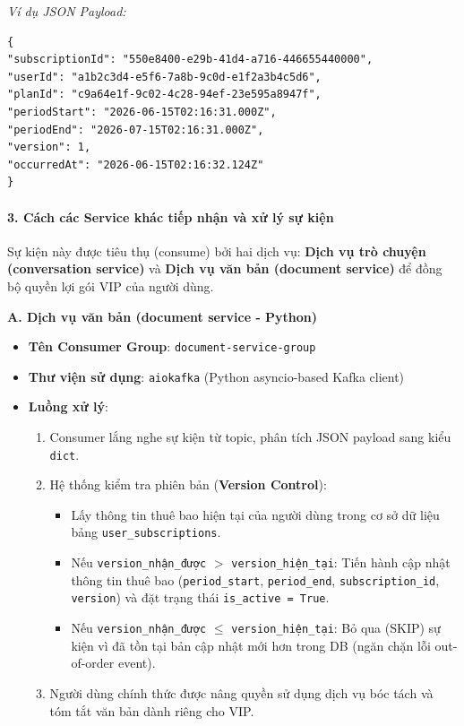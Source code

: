 \textit{Ví dụ JSON Payload:}
\begin{verbatim}
{
"subscriptionId": "550e8400-e29b-41d4-a716-446655440000",
"userId": "a1b2c3d4-e5f6-7a8b-9c0d-e1f2a3b4c5d6",
"planId": "c9a64e1f-9c02-4c28-94ef-23e595a8947f",
"periodStart": "2026-06-15T02:16:31.000Z",
"periodEnd": "2026-07-15T02:16:31.000Z",
"version": 1,
"occurredAt": "2026-06-15T02:16:32.124Z"
}
\end{verbatim}

\paragraph{3. Cách các Service khác tiếp nhận và xử lý sự kiện}
Sự kiện này được tiêu thụ (consume) bởi hai dịch vụ: \textbf{Dịch vụ trò chuyện (conversation service)} và \textbf{Dịch vụ văn bản (document service)} để đồng bộ quyền lợi gói VIP của người dùng.

\textbf{A. Dịch vụ văn bản (document service - Python)}
\begin{itemize}
\item \textbf{Tên Consumer Group}: \texttt{document-service-group}
\item \textbf{Thư viện sử dụng}: \texttt{aiokafka} (Python asyncio-based Kafka client)
\item \textbf{Luồng xử lý}:
\begin{enumerate}
\item Consumer lắng nghe sự kiện từ topic, phân tích JSON payload sang kiểu \texttt{dict}.
\item Hệ thống kiểm tra phiên bản (\textbf{Version Control}):
\begin{itemize}
\item Lấy thông tin thuê bao hiện tại của người dùng trong cơ sở dữ liệu bảng \texttt{user\_subscriptions}.
\item Nếu \texttt{version\_nhận\_được} $>$ \texttt{version\_hiện\_tại}: Tiến hành cập nhật thông tin thuê bao (\texttt{period\_start}, \texttt{period\_end}, \texttt{subscription\_id}, \texttt{version}) và đặt trạng thái \texttt{is\_active = True}.
\item Nếu \texttt{version\_nhận\_được} $\le$ \texttt{version\_hiện\_tại}: Bỏ qua (SKIP) sự kiện vì đã tồn tại bản cập nhật mới hơn trong DB (ngăn chặn lỗi out-of-order event).
\end{itemize}
\item Người dùng chính thức được nâng quyền sử dụng dịch vụ bóc tách và tóm tắt văn bản dành riêng cho VIP.
\end{enumerate}
\end{itemize}

